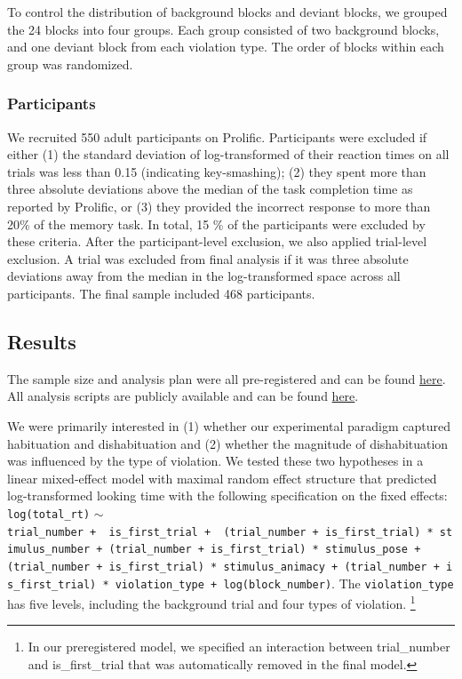 \documentclass[10pt, letterpaper]{article}
\begin{document}
To control the distribution of background blocks and deviant blocks, we
grouped the 24 blocks into four groups. Each group consisted of two
background blocks, and one deviant block from each violation type. The
order of blocks within each group was randomized.

\hypertarget{participants}{%
\subsubsection{Participants}\label{participants}}

We recruited 550 adult participants on Prolific. Participants were
excluded if either (1) the standard deviation of log-transformed of
their reaction times on all trials was less than 0.15 (indicating
key-smashing); (2) they spent more than three absolute deviations above
the median of the task completion time as reported by Prolific, or (3)
they provided the incorrect response to more than 20\% of the memory
task. In total, 15 \% of the participants were excluded by these
criteria. After the participant-level exclusion, we also applied
trial-level exclusion. A trial was excluded from final analysis if it
was three absolute deviations away from the median in the
log-transformed space across all participants. The final sample included
468 participants.

\hypertarget{results}{%
\subsection{Results}\label{results}}

The sample size and analysis plan were all pre-registered and can be
found \href{https://aspredicted.org/blind.php?x=WGF_J7K}{here}. All
analysis scripts are publicly available and can be found
\href{https://anonymous.4open.science/r/pokebaby_cogsci2024-3636/README.md}{here}.

We were primarily interested in (1) whether our experimental paradigm
captured habituation and dishabituation and (2) whether the magnitude of
dishabituation was influenced by the type of violation. We tested these
two hypotheses in a linear mixed-effect model with maximal random effect
structure that predicted log-transformed looking time with the following
specification on the fixed effects: \texttt{log(total\_rt)} \(\sim\)
\texttt{trial\_number\ +\ \ is\_first\_trial\ +\ \ (trial\_number\ +\ is\_first\_trial)\ *\ stimulus\_number\ +\ (trial\_number\ +\ is\_first\_trial)\ *\ stimulus\_pose\ +(trial\_number\ +\ is\_first\_trial)\ *\ stimulus\_animacy\ +\ (trial\_number\ +\ is\_first\_trial)\ *\ violation\_type\ +\ log(block\_number)}.
The \texttt{violation\_type} has five levels, including the background
trial and four types of violation. \footnote{In our preregistered model,
  we specified an interaction between trial\_number and is\_first\_trial
  that was automatically removed in the final model.}
\end{document}
